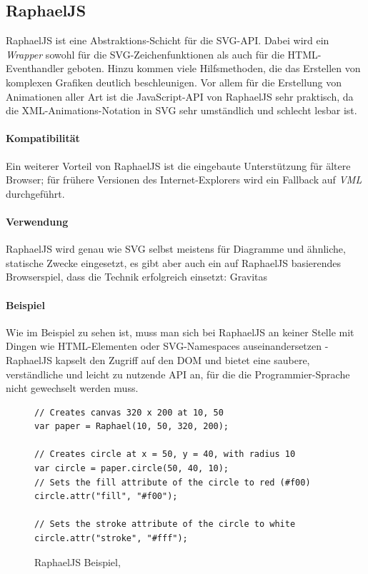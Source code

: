 \documentclass[a4paper, 12pt]{article}
\begin{document}
\subsection{RaphaelJS}
RaphaelJS ist eine Abstraktions-Schicht für die SVG-API. Dabei wird ein \emph{Wrapper} sowohl für die SVG-Zeichenfunktionen als auch für die HTML-Eventhandler geboten. Hinzu kommen viele Hilfsmethoden, die das Erstellen von komplexen Grafiken deutlich beschleunigen. Vor allem für die Erstellung von Animationen aller Art ist die JavaScript-API von RaphaelJS sehr praktisch, da die XML-Animations-Notation in SVG sehr umständlich und schlecht lesbar ist.\cite{RaphaelJS}
\paragraph{Kompatibilität} Ein weiterer Vorteil von RaphaelJS ist die eingebaute Unterstützung für ältere Browser; für frühere Versionen des Internet-Explorers wird ein Fallback auf \emph{VML} durchgeführt.\cite{RaphaelJS}
\paragraph{Verwendung} RaphaelJS wird genau wie SVG selbst meistens für Diagramme und ähnliche, statische Zwecke eingesetzt, es gibt aber auch ein auf RaphaelJS basierendes Browserspiel, dass die Technik erfolgreich einsetzt: Gravitas \cite{Gravitas}
\paragraph{Beispiel}
Wie im Beispiel zu sehen ist, muss man sich bei RaphaelJS an keiner Stelle mit Dingen wie HTML-Elementen oder SVG-Namespaces auseinandersetzen - RaphaelJS kapselt den Zugriff auf den DOM und bietet eine saubere, verständliche und leicht zu nutzende API an, für die die Programmier-Sprache nicht gewechselt werden muss. 
\begin{figure}[H]
	\begin{verbatim}
// Creates canvas 320 x 200 at 10, 50
var paper = Raphael(10, 50, 320, 200);

// Creates circle at x = 50, y = 40, with radius 10
var circle = paper.circle(50, 40, 10);
// Sets the fill attribute of the circle to red (#f00)
circle.attr("fill", "#f00");

// Sets the stroke attribute of the circle to white
circle.attr("stroke", "#fff");	
	\end{verbatim}
	\caption{RaphaelJS Beispiel, \cite{RaphaelJS}}
	\label{raphaeljs_example}
\end{figure}
\newpage
\end{document}
